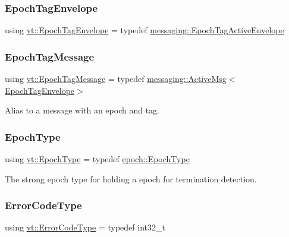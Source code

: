 \subsubsection{\texorpdfstring{Epoch\+Tag\+Envelope}{EpochTagEnvelope}}
{\footnotesize\ttfamily using \hyperlink{namespacevt_af23b58014ced6898422213a0e5e6a27a}{vt\+::\+Epoch\+Tag\+Envelope} = typedef \hyperlink{structvt_1_1messaging_1_1_epoch_tag_active_envelope}{messaging\+::\+Epoch\+Tag\+Active\+Envelope}}

\mbox{\label{namespacevt_a4ccc13b06bff8a4a35426a1a082a95a9}} 
\subsubsection{\texorpdfstring{Epoch\+Tag\+Message}{EpochTagMessage}}
{\footnotesize\ttfamily using \hyperlink{namespacevt_a4ccc13b06bff8a4a35426a1a082a95a9}{vt\+::\+Epoch\+Tag\+Message} = typedef \hyperlink{structvt_1_1messaging_1_1_active_msg}{messaging\+::\+Active\+Msg}$<$\hyperlink{namespacevt_af23b58014ced6898422213a0e5e6a27a}{Epoch\+Tag\+Envelope}$>$}



Alias to a message with an epoch and tag. 

\mbox{\label{namespacevt_a81d11b28122d43bf9834577e4a06440f}} 
\subsubsection{\texorpdfstring{Epoch\+Type}{EpochType}}
{\footnotesize\ttfamily using \hyperlink{namespacevt_a81d11b28122d43bf9834577e4a06440f}{vt\+::\+Epoch\+Type} = typedef \hyperlink{structvt_1_1epoch_1_1_epoch_type}{epoch\+::\+Epoch\+Type}}



The strong epoch type for holding a epoch for termination detection. 

\mbox{\label{namespacevt_a793764d753923abc3d32929870beb485}} 
\subsubsection{\texorpdfstring{Error\+Code\+Type}{ErrorCodeType}}
{\footnotesize\ttfamily using \hyperlink{namespacevt_a793764d753923abc3d32929870beb485}{vt\+::\+Error\+Code\+Type} = typedef int32\+\_\+t}




